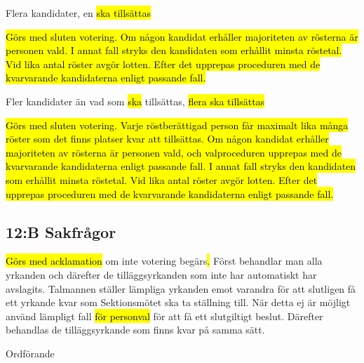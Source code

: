 \documentclass[../_main/handlingar.tex]{subfiles}
\begin{document}
\begin{attsatser}
\begin{alphlist}
        \item Flera kandidater, en \hl{ska tillsättas}\par
        \hl{
        Görs med sluten votering.
        Om någon kandidat erhåller majoriteten av rösterna är personen vald.
        I annat fall stryks den kandidaten som erhållit minsta röstetal.
        Vid lika antal röster avgör lotten.
        Efter det upprepas proceduren med de kvarvarande kandidaterna enligt passande fall.
        }

        \item Fler kandidater än vad som \hl{ska} tillsättas, \hl{flera ska tillsättas}\par
        \hl{
        Görs med sluten votering.
        Varje röstberättigad person får maximalt lika många röster som det finns platser kvar att tillsättas.
        Om någon kandidat erhåller majoriteten av rösterna är personen vald, och valproceduren upprepas med de kvarvarande kandidaterna enligt passande fall.
        I annat fall stryks den kandidaten som erhållit minsta röstetal.
        Vid lika antal röster avgör lotten.
        Efter det upprepas proceduren med de kvarvarande kandidaterna enligt passande fall.
        }
        \end{alphlist}

        \subsection{12:B Sakfrågor}

        \hl{Görs med acklamation} om inte votering begärs\hl{. }Först behandlar man alla yrkanden och därefter de tilläggsyrkanden som inte har automatiskt har avslagits. Talmannen ställer lämpliga yrkanden emot varandra för att slutligen få ett yrkande kvar som Sektionsmötet ska ta ställning till. När detta ej är möjligt använd lämpligt fall \hl{för personval} för att få ett slutgiltigt beslut. Därefter behandlas de tilläggsyrkande som finns kvar på samma sätt.

    \changenote

\end{attsatser}

\begin{signatures}{1}
    \ist
    \signature{\ordf}{Ordförande}
\end{signatures}
\end{document}

